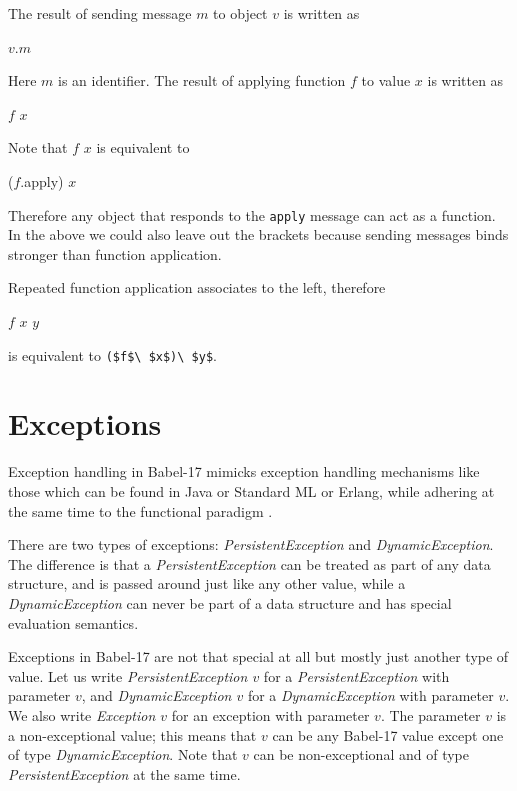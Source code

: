 \documentclass[11pt]{amsart}
\newcommand{\metababel}[1] {\textsl{#1}}
\newcommand{\babelsrc}[1] {\lstinline!#1!}
\begin{document}
The result of sending message $m$ to object $v$  is written as
\begin{babellisting}
$v$.$m$
\end{babellisting}
Here $m$ is an identifier. 
The result of applying function $f$ to value $x$ is written as 
\begin{babellisting}
$f$ $x$
\end{babellisting}
Note that $f$ $x$ is equivalent to 
\begin{babellisting}
($f$.apply) $x$
\end{babellisting}
Therefore any object that responds to the \babelsrc{apply} message can act as a function.
In the above we could also leave out the brackets because sending messages binds stronger than function application. 

Repeated function application associates to the left, therefore 
\begin{babellisting}
$f$ $x$ $y$ 
\end{babellisting} 
is equivalent to \babelsrc{($f$\ $x$)\ $y$}.

\section{Exceptions}
Exception handling in Babel-17 mimicks exception handling mechanisms like those which can be found in Java or Standard ML or Erlang, while adhering at the same time to the functional paradigm .

There are two types of exceptions: \metababel{PersistentException} and  \metababel{DynamicException}.
The difference is that a \metababel{PersistentException}  can be treated as part of any data structure, and is passed around just like any other value, while a \metababel{DynamicException} can never be part of a data structure and has special evaluation semantics. 

Exceptions in Babel-17 are not that special at all but mostly just another type of value.  Let us write \metababel{PersistentException $v$} for a \metababel{PersistentException} with parameter $v$,
and  \metababel{DynamicException $v$} for a \metababel{DynamicException} with parameter $v$. 
We also write \metababel{Exception $v$} for an exception with parameter $v$. The parameter $v$ is a non-exceptional value; this means that $v$ can be any Babel-17 value except one of type \metababel{DynamicException}. Note that $v$ can be non-exceptional and of type \metababel{PersistentException} at the same time.
\end{document}
